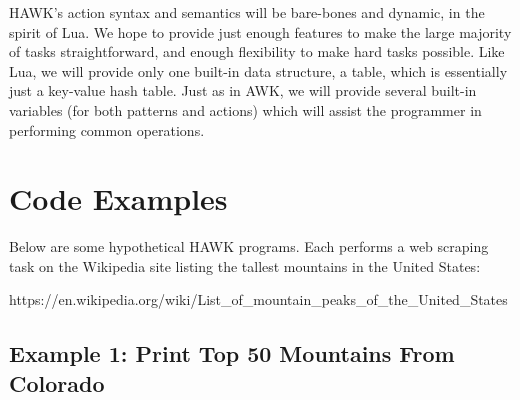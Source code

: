 \documentclass[12pt]{article}
\begin{document}
HAWK's action syntax and semantics will be bare-bones and dynamic, in the spirit of Lua. We hope to provide just enough features to make the large majority of tasks straightforward, and enough flexibility to make hard tasks possible. Like Lua, we will provide only one built-in data structure, a table, which is essentially just a key-value hash table. Just as in AWK, we will provide several built-in variables (for both patterns and actions) which will assist the programmer in performing common operations.

\section*{Code Examples}

Below are some hypothetical HAWK programs. Each performs a web scraping task on the Wikipedia site listing the tallest mountains in the United States:

https://en.wikipedia.org/wiki/List\_of\_mountain\_peaks\_of\_the\_United\_States

\subsection*{Example 1: Print Top 50 Mountains From Colorado}
\end{document}
